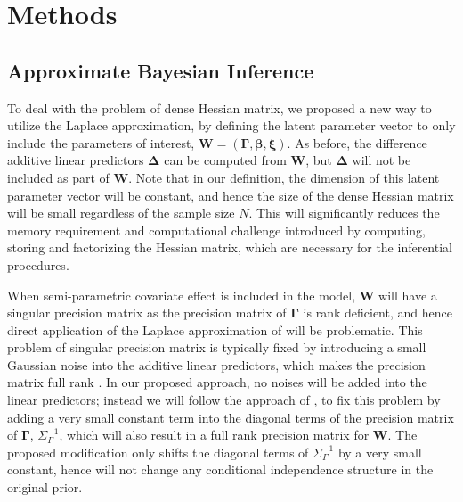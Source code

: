 \documentclass[ba]{imsart}
\begin{document}
\section{Methods}\label{sec:method}


\subsection{Approximate Bayesian Inference}\label{subsec:abi}


To deal with the problem of dense Hessian matrix, we proposed a new way to utilize the Laplace approximation, by defining the latent parameter vector to only include the parameters of interest, $\boldsymbol{W} = (\boldsymbol{\Gamma},\boldsymbol{\beta}, \boldsymbol{\xi})$. As before, the difference additive linear predictors $\boldsymbol{\Delta}$ can be computed from $\boldsymbol{W}$, but $\boldsymbol{\Delta}$ will not be included as part of $\boldsymbol{W}$. Note that in our definition, the dimension of this latent parameter vector will be constant, and hence the size of the dense Hessian matrix will be small regardless of the sample size $N$. This will significantly reduces the memory requirement and computational challenge introduced by computing, storing and factorizing the Hessian matrix, which are necessary for the inferential procedures. 

When semi-parametric covariate effect is included in the model, $\boldsymbol{W}$ will have a singular precision matrix as the precision matrix of $\boldsymbol{\Gamma}$ is rank deficient, and hence direct application of the Laplace approximation of \cite{tierney} will be problematic. This problem of singular precision matrix is typically fixed by introducing a small Gaussian noise into the additive linear predictors, which makes the precision matrix full rank \citep{casecross, inla}. In our proposed approach, no noises will be added into the linear predictors; instead we will follow the approach of \cite{wood2011fast}, to fix this problem by adding a very small constant term into the diagonal terms of the precision matrix of $\boldsymbol{\Gamma}$, $\Sigma^{-1}_\Gamma$, which will also result in a full rank precision matrix for $\boldsymbol{W}$. 
The proposed modification only shifts the diagonal terms of $\Sigma^{-1}_\Gamma$ by a very small constant, hence will not change any conditional independence structure in the original prior.
\end{document}
